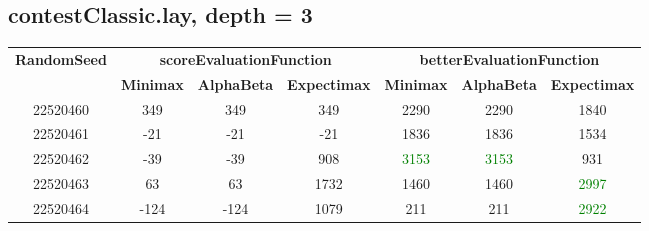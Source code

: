 \documentclass[english, a4paper,12pt]{article}
\begin{document}
\subsection*{contestClassic.lay, depth = 3}
\small\begin{tabular}{|c|c|c|c|c|c|c|}
\hline
\textbf{RandomSeed} & \multicolumn{3}{c|}{\textbf{scoreEvaluationFunction}} & \multicolumn{3}{c|}{\textbf{betterEvaluationFunction}} \\
\cline{2-7}
& \textbf{Minimax} & \textbf{AlphaBeta} & \textbf{Expectimax} & \textbf{Minimax} & \textbf{AlphaBeta} & \textbf{Expectimax} \\
\hline
22520460 & \textcolor{red!70}{349} & \textcolor{red!70}{349} & \textcolor{red!70}{349} & \textcolor{red!70}{2290} & \textcolor{red!70}{2290} & \textcolor{red!70}{1840} \\
22520461 & \textcolor{red!70}{-21} & \textcolor{red!70}{-21} & \textcolor{red!70}{-21} & \textcolor{red!70}{1836} & \textcolor{red!70}{1836} & \textcolor{red!70}{1534} \\
22520462 & \textcolor{red!70}{-39} & \textcolor{red!70}{-39} & \textcolor{red!70}{908} & \textcolor{Green}{3153} & \textcolor{Green}{3153} & \textcolor{red!70}{931} \\
22520463 & \textcolor{red!70}{63} & \textcolor{red!70}{63} & \textcolor{red!70}{1732} & \textcolor{red!70}{1460} & \textcolor{red!70}{1460} & \textcolor{Green}{2997} \\
22520464 & \textcolor{red!70}{-124} & \textcolor{red!70}{-124} & \textcolor{red!70}{1079} & \textcolor{red!70}{211} & \textcolor{red!70}{211} & \textcolor{Green}{2922} \\
\hline
\end{tabular}
\end{document}
